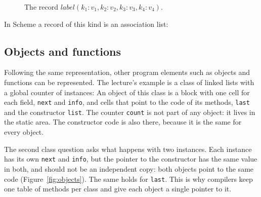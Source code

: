 \begin{figure}[h]
\centering
{}
\caption{The record $\mathit{label}(k_1 : v_1, k_2 : v_2, k_3 : v_3, k_4 : v_4)$.}
\label{fig:record}
\end{figure}

In Scheme a record of this kind is an association list:

\subsection{Objects and functions}

Following the same representation, other program elements such as objects
and functions can be represented. The lecture's example is a class of linked
lists with a global counter of instances:
An object of this class is a block with one cell for each field,
\texttt{next} and \texttt{info}, and cells that point to the code of its
methods, \texttt{last} and the constructor \texttt{list}. The counter
\texttt{count} is not part of any object: it lives in the static area. The
constructor code is also there, because it is the same for every object.

The second class question asks what happens with two instances. Each instance
has its own \texttt{next} and \texttt{info}, but the pointer to the
constructor has the same value in both, and should not be an independent copy:
both objects point to the same code (Figure~\ref{fig:objects}). The same holds
for \texttt{last}. This is why compilers keep one table of methods per class
and give each object a single pointer to it.

